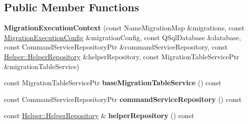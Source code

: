 \subsection*{Public Member Functions}
\begin{DoxyCompactItemize}
\item 
\mbox{\label{class_q_sql_migrator_1_1_migration_execution_1_1_migration_execution_context_a1a024cb2fb274cca746d2cca708e8ba3}} 
{\bfseries Migration\+Execution\+Context} (const Name\+Migration\+Map \&migrations, const \hyperlink{struct_q_sql_migrator_1_1_migration_execution_1_1_migration_execution_config}{Migration\+Execution\+Config} \&migration\+Config, const Q\+Sql\+Database \&database, const Command\+Service\+Repository\+Ptr \&command\+Service\+Repository, const \hyperlink{class_q_sql_migrator_1_1_helper_1_1_helper_repository}{Helper\+::\+Helper\+Repository} \&helper\+Repository, const Migration\+Table\+Service\+Ptr \&migration\+Table\+Service)
\item 
\mbox{\label{class_q_sql_migrator_1_1_migration_execution_1_1_migration_execution_context_af7729862cdc661e64cfe6c6f98d27867}} 
const Migration\+Table\+Service\+Ptr {\bfseries base\+Migration\+Table\+Service} () const
\item 
\mbox{\label{class_q_sql_migrator_1_1_migration_execution_1_1_migration_execution_context_a116043945a0594d8ea61137901c30ebf}} 
const Command\+Service\+Repository\+Ptr {\bfseries command\+Service\+Repository} () const
\item 
\mbox{\label{class_q_sql_migrator_1_1_migration_execution_1_1_migration_execution_context_a933f54d7f57e403ea40cf9f75efee130}} 
const \hyperlink{class_q_sql_migrator_1_1_helper_1_1_helper_repository}{Helper\+::\+Helper\+Repository} \& {\bfseries helper\+Repository} () const
\item 
\mbox{\label{class_q_sql_migrator_1_1_migration_execution_1_1_migration_execution_context_af45d463acedc42e80929574fa3b98c54}} 

\end{DoxyCompactItemize}
